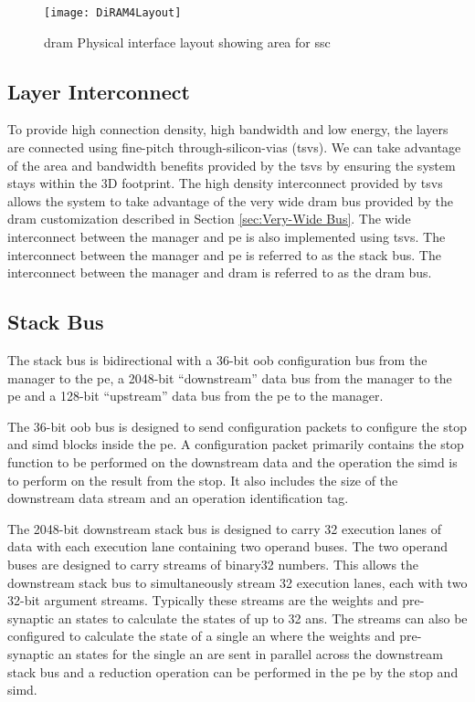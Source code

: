 \begin{figure}[!t]
\centering
\captionsetup{justification=centering}
\captionsetup{width=.9\linewidth}
\centerline{
\mbox{\texttt{[image: DiRAM4Layout]}}
}
\caption{\ac{dram} Physical interface layout showing area for \ac{ssc}}
\label{fig:diram4Layout}
\end{figure}


\subsection{Layer Interconnect}
\label{sec:Layer Interconnect}

To provide high connection density, high bandwidth and low energy,
the layers are connected using fine-pitch through-silicon-vias (\ac{tsv}s).
We can take advantage of the area and bandwidth benefits provided by the \acp{tsv} by ensuring the system stays within the 3D footprint.
The high density interconnect provided by \acp{tsv} allows the system to take advantage of the very wide \ac{dram} bus provided by the \ac{dram} customization described in Section \ref{sec:Very-Wide Bus}.
The wide interconnect between the manager and \ac{pe} is also implemented using \acp{tsv}.
The interconnect between the manager and \ac{pe} is referred to as the stack bus. The interconnect between the manager and \ac{dram} is referred to as the \ac{dram} bus.

\subsection{Stack Bus}
\label{sec:Stack Bus}

The stack bus is bidirectional with a 36-bit \ac{oob} configuration bus from the manager to the \ac{pe}, a 2048-bit ``downstream'' data bus from the manager to the \ac{pe} and a 128-bit ``upstream'' data bus from the \ac{pe} to the manager.

The 36-bit \ac{oob} bus is designed to send configuration packets to configure the \ac{stop} and \ac{simd} blocks inside the \ac{pe}.
A configuration packet primarily contains the \ac{stop} function to be performed on the downstream data and the operation the \ac{simd} is to perform on the result from the \ac{stop}.
It also includes the size of the downstream data stream and an operation identification tag.

The 2048-bit downstream stack bus is designed to carry 32 execution lanes of data with each execution lane containing two operand buses. 
The two operand buses are designed to carry streams of \ac{binary32} numbers.
This allows the downstream stack bus to simultaneously stream 32 execution lanes, each with two 32-bit argument streams. 
Typically these streams are the weights and pre-synaptic \ac{an} states to calculate the states of up to 32 \acp{an}. 
The streams can also be configured to calculate the state of a single \ac{an} where the weights and pre-synaptic \ac{an} states for the single \ac{an} are sent in parallel across the downstream stack bus and a reduction operation can be performed in the \ac{pe} by the \ac{stop} and \ac{simd}.

